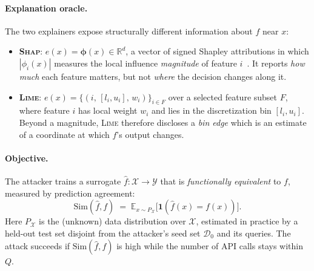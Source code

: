 \documentclass[sigconf,anonymous,review]{acmart}
\begin{document}
\paragraph{Explanation oracle.}
The two explainers expose structurally different information about $f$ near $x$:
\begin{itemize}
  \item \textbf{\textsc{Shap}}: $e(x) = \boldsymbol{\phi}(x) \in \mathbb{R}^{d}$, a vector of
  signed Shapley attributions in which $|\phi_i(x)|$ measures the local influence
  \emph{magnitude} of feature $i$~\cite{lundberg2017shap}. It reports \emph{how much}
  each feature matters, but not \emph{where} the decision changes along it.
  \item \textbf{\textsc{Lime}}: $e(x) = \{(i,\, [l_i, u_i],\, w_i)\}_{i \in F}$ over a
  selected feature subset $F$, where feature $i$ has local weight $w_i$ and lies in
  the discretization bin $[l_i, u_i]$. Beyond a magnitude, \textsc{Lime} therefore
  discloses a \emph{bin edge} which is an estimate of a coordinate at which $f$'s output
  changes.
\end{itemize}

\paragraph{Objective.}
The attacker trains a surrogate $\hat{f} : \mathcal{X} \to \mathcal{Y}$ that is
\emph{functionally equivalent} to $f$, measured by prediction agreement:
\begin{equation}
    \mathrm{Sim}(\hat{f}, f) \;=\; \mathbb{E}_{x \sim P_{\mathcal{X}}}
    \bigl[\mathbf{1}(\hat{f}(x) = f(x))\bigr].
    \label{eq:sim}
\end{equation}
Here $P_{\mathcal{X}}$ is the (unknown) data distribution over $\mathcal{X}$,
estimated in practice by a held-out test set disjoint from the attacker's seed set
$\mathcal{D}_{0}$ and its queries.
The attack succeeds if $\mathrm{Sim}(\hat{f}, f)$ is high while the number of API
calls stays within $Q$. 
\end{document}
